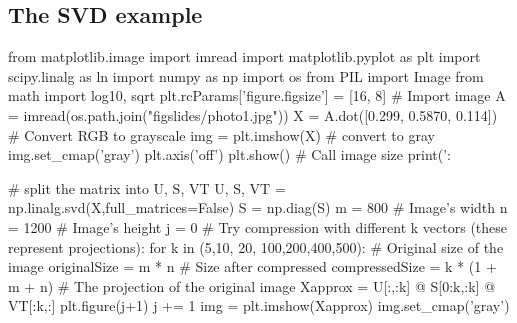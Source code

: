 \documentclass[%
oneside,                 %
final,                   %
10pt]{article}
\begin{document}
\subsection{The SVD example}





























































\bpycod
from matplotlib.image import imread
import matplotlib.pyplot as plt
import scipy.linalg as ln
import numpy as np
import os
from PIL import Image
from math import log10, sqrt 
plt.rcParams['figure.figsize'] = [16, 8]
# Import image
A = imread(os.path.join("figslides/photo1.jpg"))
X = A.dot([0.299, 0.5870, 0.114]) # Convert RGB to grayscale
img = plt.imshow(X)
# convert to gray
img.set_cmap('gray')
plt.axis('off')
plt.show()
# Call image size
print(': %


# split the matrix into U, S, VT
U, S, VT = np.linalg.svd(X,full_matrices=False)
S = np.diag(S)
m = 800 # Image's width
n = 1200 # Image's height
j = 0
# Try compression with different k vectors (these represent projections):
for k in (5,10, 20, 100,200,400,500):
    # Original size of the image
    originalSize = m * n 
    # Size after compressed
    compressedSize = k * (1 + m + n) 
    # The projection of the original image
    Xapprox = U[:,:k] @ S[0:k,:k] @ VT[:k,:]
    plt.figure(j+1)
    j += 1
    img = plt.imshow(Xapprox)
    img.set_cmap('gray')
    
\end{document}
